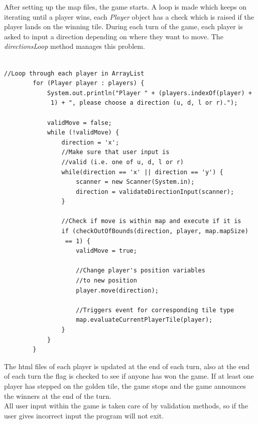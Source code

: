 \documentclass[a4paper,12pt]{extarticle}
\begin{document}
\noindent After setting up the map files, the game starts. A loop is made which keeps on iterating until a player wins, each \textit{Player} object has a check which is raised if the player lands on the winning tile. During each turn of the game, each player is asked to input a direction depending on where they want to move. The \textit{directionsLoop} method manages this problem.\\

\newpage
\begin{lstlisting}

//Loop through each player in ArrayList
        for (Player player : players) {
            System.out.println("Player " + (players.indexOf(player) +
             1) + ", please choose a direction (u, d, l or r).");

            validMove = false;
            while (!validMove) {
                direction = 'x';
                //Make sure that user input is
                //valid (i.e. one of u, d, l or r)
                while(direction == 'x' || direction == 'y') {
                    scanner = new Scanner(System.in);
                    direction = validateDirectionInput(scanner);
                }

                //Check if move is within map and execute if it is
                if (checkOutOfBounds(direction, player, map.mapSize)
                 == 1) {
                    validMove = true;

                    //Change player's position variables 
                    //to new position
                    player.move(direction);

                    //Triggers event for corresponding tile type
                    map.evaluateCurrentPlayerTile(player);
                }
            }
        }

\end{lstlisting}
\vspace{4mm}

\noindent The html files of each player is updated at the end of each turn, also at the end of each turn the flag is checked to see if anyone has won the game. If at least one player has stepped on the golden tile, the game stops and the game announces the winners at the end of the turn.\\

\noindent All user input within the game is taken care of by validation methods, so if the user gives incorrect input the program will not exit.\\
\newpage
\end{document}
